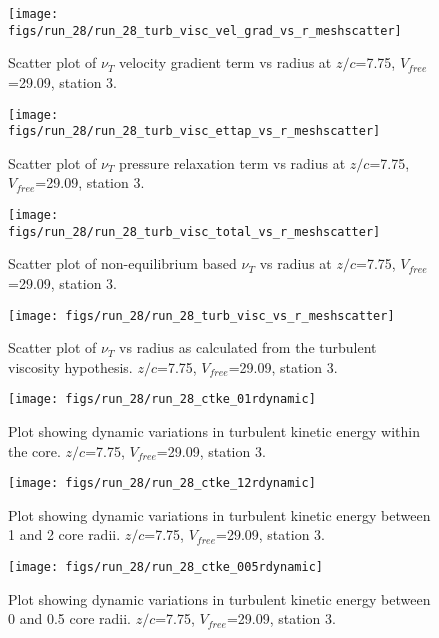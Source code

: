 \begin{figure}[H]
\centering
\texttt{[image: figs/run\_28/run\_28\_turb\_visc\_vel\_grad\_vs\_r\_meshscatter]}
\caption{Scatter plot of $\nu_T$ velocity gradient term vs radius at $z/c$=7.75, $V_{free}$=29.09, station 3.}
\end{figure}


\begin{figure}[H]
\centering
\texttt{[image: figs/run\_28/run\_28\_turb\_visc\_ettap\_vs\_r\_meshscatter]}
\caption{Scatter plot of $\nu_T$ pressure relaxation term vs radius at $z/c$=7.75, $V_{free}$=29.09, station 3.}
\end{figure}


\begin{figure}[H]
\centering
\texttt{[image: figs/run\_28/run\_28\_turb\_visc\_total\_vs\_r\_meshscatter]}
\caption{Scatter plot of non-equilibrium based $\nu_T$ vs radius at $z/c$=7.75, $V_{free}$=29.09, station 3.}
\end{figure}


\begin{figure}[H]
\centering
\texttt{[image: figs/run\_28/run\_28\_turb\_visc\_vs\_r\_meshscatter]}
\caption{Scatter plot of $\nu_T$ vs radius as calculated from the turbulent viscosity hypothesis. $z/c$=7.75, $V_{free}$=29.09, station 3.}
\end{figure}


\begin{figure}[H]
\centering
\texttt{[image: figs/run\_28/run\_28\_ctke\_01rdynamic]}
\caption{Plot showing dynamic variations in turbulent kinetic energy within the core. $z/c$=7.75, $V_{free}$=29.09, station 3.}
\end{figure}


\begin{figure}[H]
\centering
\texttt{[image: figs/run\_28/run\_28\_ctke\_12rdynamic]}
\caption{Plot showing dynamic variations in turbulent kinetic energy between 1 and 2 core radii. $z/c$=7.75, $V_{free}$=29.09, station 3.}
\end{figure}


\begin{figure}[H]
\centering
\texttt{[image: figs/run\_28/run\_28\_ctke\_005rdynamic]}
\caption{Plot showing dynamic variations in turbulent kinetic energy between 0 and 0.5 core radii. $z/c$=7.75, $V_{free}$=29.09, station 3.}
\end{figure}


